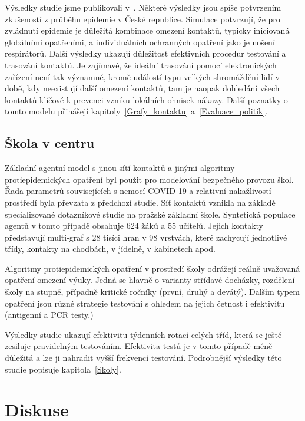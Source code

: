 Výsledky studie jsme publikovali v~\cite{model-m-medrxiv}. Některé výsledky jsou spíše potvrzením zkušeností z průběhu epidemie v České republice. Simulace potvrzují, že pro zvládnutí epidemie je důležitá kombinace omezení kontaktů, typicky iniciovaná globálními opatřeními, a individuálních ochranných opatření jako je nošení respirátorů. Další výsledky ukazují důležitost efektivních procedur testování a trasování kontaktů. Je zajímavé, že ideální trasování pomocí elektronických zařízení není tak významné, kromě událostí typu velkých shromáždění lidí v době, kdy neexistují další omezení kontaktů, tam je naopak dohledání všech kontaktů klíčové k prevenci vzniku lokálních ohnisek nákazy. Další poznatky o tomto modelu přinášejí kapitoly~\ref{Grafy_kontaktu}
a~\ref{Evaluace_politik}.


\subsection*{Škola v centru}

Základní agentní model s jinou sítí kontaktů a jinými algoritmy protiepidemických opatření byl použit pro modelování bezpečného provozu škol. Řada parametrů souvisejících s nemocí COVID-19 a relativní nakažlivostí prostředí byla převzata z předchozí studie. Síť kontaktů vznikla na základě specializované dotazníkové studie na pražské základní škole. Syntetická populace agentů v tomto případě obsahuje 624 žáků a 55 učitelů. Jejich kontakty představují multi-graf s 28 tisíci hran v 98 vrstvách, které zachycují jednotlivé třídy, kontakty na chodbách, v jídelně, v kabinetech apod. 

Algoritmy protiepidemických opatření v prostředí školy odrážejí reálně uvažovaná opatření omezení výuky. Jedná se hlavně o varianty střídavé docházky, rozdělení školy na stupně, případně kritické ročníky (první, druhý a devátý). Dalším typem opatření jsou různé strategie testování s ohledem na jejich četnost i efektivitu (antigenní a PCR testy.)

Výsledky studie ukazují efektivitu týdenních rotací celých tříd, která se ještě zesiluje pravidelným testováním. Efektivita testů je v tomto případě méně důležitá a lze ji nahradit vyšší frekvencí testování. Podrobnější výsledky této studie popisuje kapitola~\ref{Skoly}.







\section*{Diskuse} 

